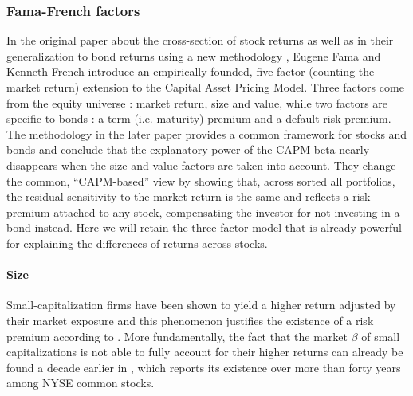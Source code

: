 \subsubsection{Fama-French factors}
In the original paper about the cross-section of stock returns \parencite{Fama1992} as well as in their generalization to bond returns using a new methodology \parencite{Fama1993}, Eugene Fama and Kenneth French introduce an empirically-founded, five-factor (counting the market return) extension to the Capital Asset Pricing Model. Three factors come from the equity universe : market return, size and value, while two factors are specific to bonds : a term (i.e. maturity) premium and a default risk premium. The methodology in the later paper provides a common framework for stocks and bonds and conclude that the explanatory power of the CAPM beta nearly disappears when the size and value factors are taken into account. They change the common, ``CAPM-based'' view by showing that, across sorted all portfolios, the residual sensitivity to the market return is the same and reflects a risk premium attached to any stock, compensating the investor for not investing in a bond instead. Here we will retain the three-factor model that is already powerful for explaining the differences of returns across stocks.
\paragraph{Size}
Small-capitalization firms have been shown to yield a higher return adjusted by their market exposure and this phenomenon justifies the existence of a risk premium according to \textcite{Fama1992}. More fundamentally, the fact that the market $\beta$ of small capitalizations is not able to fully account for their higher returns can already be found a decade earlier in \textcite{Banz1981}, which reports its existence over more than forty years among NYSE common stocks.


